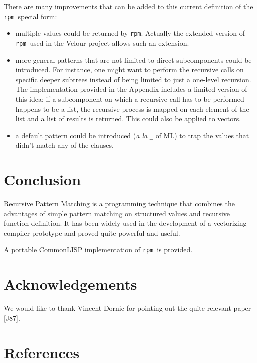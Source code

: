 \documentclass[a4paper,11pt]{article}
\newcommand{\rpm}{\texttt{rpm}}
\begin{document}
There are many improvements that can be added to this current
definition of the \rpm\ special form: 
\begin{itemize}
\item
	multiple values could be returned by \rpm. Actually the extended
version of \rpm\ used in the Velour project allows such an extension.
\item
	more general patterns that are not limited to direct
subcomponents could be introduced. For instance, one might want to
perform the recursive calls on specific deeper subtrees instead of
being limited to just a one-level recursion. The implementation
provided in the Appendix includes a limited version of this idea; if a
subcomponent on which a recursive call has to be performed happens to
be a list, the recursive process is mapped on each element of the list
and a list of results is returned. This could also be applied to
vectors.
\item
	a default pattern could be introduced (\emph{a la} \texttt{\_} of
ML) to trap the values that didn't match any of the clauses.
\end{itemize}

\section{Conclusion}

Recursive Pattern Matching is a programming technique that combines
the advantages of simple pattern matching on structured values and
recursive function definition. It has been widely used in the
development of a vectorizing compiler prototype and proved quite
powerful and useful. 

A portable CommonLISP implementation of \rpm\ is provided. 

\section*{Acknowledgements}

We would like to thank Vincent Dornic for pointing out the quite
relevant paper [J87].

\section*{References}
\end{document}
